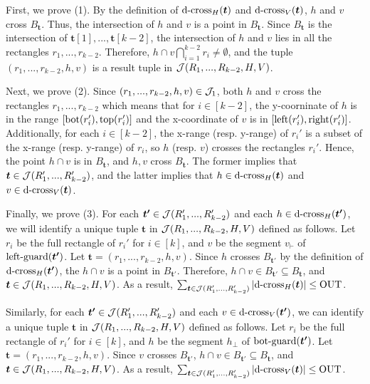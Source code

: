 First, we prove (1). By the definition of $\mathrm{d\text{-}cross}_H(\textrm{\boldmath${t}$})$ and $\mathrm{d\text{-}cross}_V(\textrm{\boldmath${t}$})$, $h$ and $v$ cross $B_\bm{t}$. Thus, the intersection of $h$ and $v$ is a point in $B_\bm{t}$. Since $B_\bm{t}$ is the intersection of $\bm{t}[1],...,\bm{t}[k-2]$, the intersection of $h$ and $v$ lies in all the rectangles $r_1,...,r_{k-2}$. Therefore, $h\cap v\bigcap_{i = 1}^{k-2}r_i \neq \emptyset$, and  the tuple $(r_1,...,r_{k-2},h,v)$ is a result tuple in $\mathcal{J}(R_1,...,R_{k-2},H,V)$. 

Next, we prove (2). Since $(r_1,...,r_{k-2},h,v)\in \mathcal{J}_1$, both $h$
 and $v$ cross the rectangles $r_1,...,r_{k-2}$ which means that for $i\in[k-2]$, the y-coorninate of $h$ is in the range $[\mathrm{bot}(r_i'), \mathrm{top}(r_i')]$ and the x-coordinate of $v$ is in $[\mathrm{left}(r_i'), \mathrm{right}(r_i')]$. Additionally, for each $i\in[k-2]$, the x-range (resp. y-range) of $r_i'$ is a subset of the x-range (resp. y-range) of $r_i$, so $h$ (resp. $v$) crosses the rectangles $r_i'$. Hence, the point $h \cap v$ is in $B_\bm{t}$, and $h, v$ cross $B_{\bm{t}}$. The former implies that $\textrm{\boldmath${t}$} \in \mathcal{J}(R_1',...,R_{k-2}')$, and the latter implies that $h \in \mathrm{d\text{-}cross}_H(\textrm{\boldmath${t}$})$ and $v \in \mathrm{d\text{-}cross}_V(\textrm{\boldmath${t}$})$.

Finally, we prove (3). 
For each $\textrm{\boldmath${t'}$}\in  \mathcal{J}(R_1',...,R_{k-2}')$ and each $h \in \mathrm{d\text{-}cross}_H(\textrm{\boldmath${t'}$})$, we will identify a unique tuple $\bm{t}$ in $\mathcal{J}(R_1,...,R_{k-2},H,V)$ defined as follows. Let $r_i$ be the full rectangle of $r_i'$ for $i \in [k]$, and $v$ be the segment $v_\vdash$ of $\mathrm{left\text{-}guard}(\textrm{\boldmath${t'}$})$. Let $\bm{t} = (r_1,...,r_{k-2},h,v)$. Since $h$ crosses $B_{\bm{t'}}$ by the definition of $\mathrm{d\text{-}cross}_H(\textrm{\boldmath${t'}$})$, the $h\cap v$ is a point in $B_{\bm{t'}}$. 
Therefore, $h\cap v \in B_{\bm{t'}} \subseteq B_{\bm{t}}$, and $\textrm{\boldmath${t}$}\in \mathcal{J}(R_1,...,R_{k-2},H,V)$. As a result, $\sum_{\textrm{\boldmath${t}$}\in \mathcal{J}(R_1',...,R_{k-2}')}  |\mathrm{d\text{-}cross}_H(\textrm{\boldmath${t}$})| \leq \mathrm{OUT}$. 

Similarly, for each $\textrm{\boldmath${t'}$}\in  \mathcal{J}(R_1',...,R_{k-2}')$ and each $v \in \mathrm{d\text{-}cross}_V(\textrm{\boldmath${t'}$})$, we can identify a unique tuple $\bm{t}$ in $\mathcal{J}(R_1,...,R_{k-2},H,V)$ defined as follows. Let $r_i$ be the full rectangle of $r_i'$ for $i \in [k]$, and $h$ be the segment $h_\bot$ of $\mathrm{bot\text{-}guard}(\textrm{\boldmath${t'}$})$. Let $\bm{t} = (r_1,...,r_{k-2},h,v)$. Since $v$ crosses $B_{\bm{t'}}$, $h\cap v \in B_{\bm{t'}} \subseteq B_{\bm{t}}$, and $\textrm{\boldmath${t}$}\in \mathcal{J}(R_1,...,R_{k-2},H,V)$. As a result, $\sum_{\textrm{\boldmath${t}$}\in \mathcal{J}(R_1',...,R_{k-2}')}  |\mathrm{d\text{-}cross}_V(\textrm{\boldmath${t}$})| \leq \mathrm{OUT}$. 